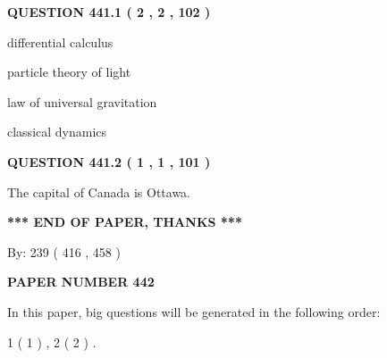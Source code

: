 \documentclass[12pt]{article}
\begin{document}
{\textbf{\Large{QUESTION
441.1 
 ( 2 , 2 , 102 )
}}}
  
  
 
 
\noindent{}
 
 
differential calculus
 
 
particle theory of light
 
 
law of universal gravitation
 
 
classical dynamics
 
 
 
 
  
\vspace{0.2in}
  
{\textbf{\Large{QUESTION
441.2 
 ( 1 , 1 , 101 )
}}}
  
  
 
 
\noindent{}
 
 
The capital of Canada is Ottawa.
 
 
 
 
   
   
\vspace{1.0in} 
{\textbf{\large{ *** END OF PAPER, THANKS *** }}} 
   
   
\hspace{1.0in} By: 
 239 ( 416 ,  458 )
   
   
   
   
\newpage 
\setcounter{page}{ 
   442001 } 
   
   
   
   
 {\textbf{ \Large{ PAPER NUMBER  442  }}}
   
   
\vspace{0.2in}
   
   
   
   
   
\vspace{0.2in}
   
In this paper, big questions will be generated in the following order: 
   
   
   1 ( 1 )
 ,
   2 ( 2 )
 .
  
\vspace{0.2in}
  
\end{document}
